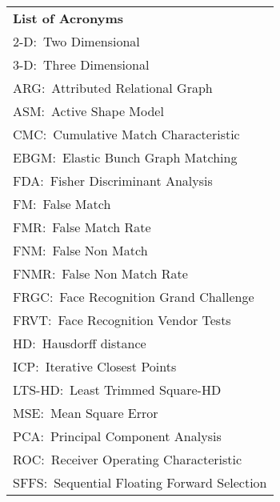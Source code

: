 \begin{tabular}{l}
\Huge {\bf List of Acronyms}\\
2-D:~Two Dimensional\\
3-D:~Three Dimensional\\
ARG:~Attributed Relational Graph\\
ASM:~Active Shape Model\\
CMC:~Cumulative Match Characteristic\\
EBGM:~Elastic Bunch Graph Matching\\
FDA:~Fisher Discriminant Analysis\\
FM:~False Match\\
FMR:~False Match Rate\\
FNM:~False Non Match\\
FNMR:~False Non Match Rate\\
FRGC:~Face Recognition Grand Challenge\\
FRVT:~Face Recognition Vendor Tests\\
HD:~Hausdorff distance\\
ICP:~Iterative Closest Points\\
LTS-HD:~Least Trimmed Square-HD\\
MSE:~Mean Square Error\\
PCA:~Principal Component Analysis\\
ROC:~Receiver Operating Characteristic\\
SFFS:~Sequential Floating Forward Selection\\
\end{tabular}
